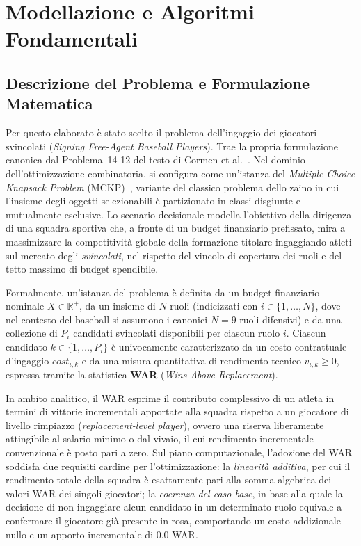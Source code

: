 \section{Modellazione e Algoritmi Fondamentali}

\subsection{Descrizione del Problema e Formulazione Matematica}
Per questo elaborato è stato scelto il problema dell'ingaggio dei giocatori svincolati (\textit{Signing Free-Agent Baseball Players}). Trae la propria formulazione canonica dal Problema~14-12 del testo di Cormen et al.~\cite{clrs}. Nel dominio dell'ottimizzazione combinatoria, si configura come un'istanza del \textit{Multiple-Choice Knapsack Problem} (MCKP)~\cite{kellerer2004knapsack}, variante del classico problema dello zaino in cui l'insieme degli oggetti selezionabili è partizionato in classi disgiunte e mutualmente esclusive. Lo scenario decisionale modella l'obiettivo della dirigenza di una squadra sportiva che, a fronte di un budget finanziario prefissato, mira a massimizzare la competitività globale della formazione titolare ingaggiando atleti sul mercato degli \textit{svincolati}, nel rispetto del vincolo di copertura dei ruoli e del tetto massimo di budget spendibile.

Formalmente, un'istanza del problema è definita da un budget finanziario nominale $X \in \mathbb{R}^+$, da un insieme di $N$ ruoli (indicizzati con $i \in \{1, \dots, N\}$, dove nel contesto del baseball si assumono i canonici $N = 9$ ruoli difensivi) e da una collezione di $P_i$ candidati svincolati disponibili per ciascun ruolo $i$. Ciascun candidato $k \in \{1, \dots, P_i\}$ è univocamente caratterizzato da un costo contrattuale d'ingaggio $\mathit{cost}_{i,k}$ e da una misura quantitativa di rendimento tecnico $v_{i,k} \ge 0$, espressa tramite la statistica \textbf{WAR} (\textit{Wins Above Replacement}).

In ambito analitico, il WAR esprime il contributo complessivo di un atleta in termini di vittorie incrementali apportate alla squadra rispetto a un giocatore di livello rimpiazzo (\textit{replacement-level player}), ovvero una riserva liberamente attingibile al salario minimo o dal vivaio, il cui rendimento incrementale convenzionale è posto pari a zero. Sul piano computazionale, l'adozione del WAR soddisfa due requisiti cardine per l'ottimizzazione:
la \textit{linearità additiva}, per cui il rendimento totale della squadra è esattamente pari alla somma algebrica dei valori WAR dei singoli giocatori;
la \textit{coerenza del caso base}, in base alla quale la decisione di non ingaggiare alcun candidato in un determinato ruolo equivale a confermare il giocatore già presente in rosa, comportando un costo addizionale nullo e un apporto incrementale di $0.0$ WAR.

